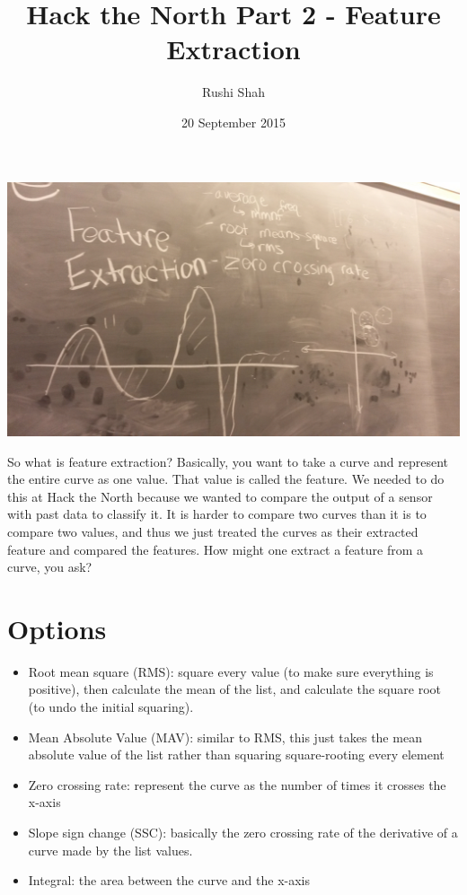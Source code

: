 \documentclass[12pt]{article}
\title{Hack the North Part 2 - Feature Extraction}
\author{Rushi Shah}
\date{20 September 2015}
\begin{document}
  \maketitle

\begin{center}
\includegraphics[width=6in]{feature-vectors}
\end{center}

So what is feature extraction? Basically, you want to take a curve and
represent the entire curve as one value. That value is called the
feature. We needed to do this at Hack the North because we wanted to
compare the output of a sensor with past data to classify it. It is
harder to compare two curves than it is to compare two values, and thus
we just treated the curves as their extracted feature and compared the
features. How might one extract a feature from a curve, you ask?

\section{Options}\label{options}

\begin{itemize}
\item
  Root mean square (RMS): square every value (to make sure everything is
  positive), then calculate the mean of the list, and calculate the
  square root (to undo the initial squaring).
\item
  Mean Absolute Value (MAV): similar to RMS, this just takes the mean
  absolute value of the list rather than squaring square-rooting every
  element
\item
  Zero crossing rate: represent the curve as the number of times it
  crosses the x-axis
\item
  Slope sign change (SSC): basically the zero crossing rate of the
  derivative of a curve made by the list values.
\item
  Integral: the area between the curve and the x-axis
\end{itemize}
\end{document}
